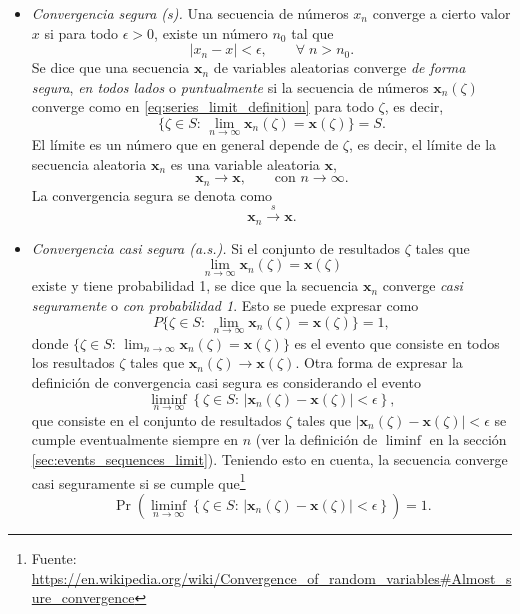\documentclass[a4paper]{report}
\newcommand{\x}{\mathbf{x}}
\begin{document}
\begin{itemize}
 \item \emph{Convergencia segura (s).} Una secuencia de números \(x_n\) converge a cierto valor \(x\) si para todo \(\epsilon>0\), existe un número \(n_0\) tal que
 \begin{equation}\label{eq:series_limit_definition}
    |x_n-x|<\epsilon,\qquad\forall\;n>n_0.
 \end{equation}
 Se dice que una secuencia \(\x_n\) de variables aleatorias converge \emph{de forma segura}, \emph{en todos lados} o \emph{puntualmente} si la secuencia de números \(\x_n(\zeta)\) converge como en \ref{eq:series_limit_definition} para todo \(\zeta\), es decir,
 \[
  \{\zeta\in S:\,\lim_{n\to\infty}\x_n(\zeta)=\x(\zeta)\}=S.
 \]
 El límite es un número que en general depende de \(\zeta\), es decir, el límite de la secuencia aleatoria \(\x_n\) es una variable aleatoria \(\x\),
 \[
  \x_n\to\x,\qquad \textrm{con }n\to\infty.
 \]
 La convergencia segura se denota como
 \[
  \x_n\overset{s}{\longrightarrow}\x.
 \]  
 \item \emph{Convergencia casi segura (a.s.).} Si el conjunto de resultados \(\zeta\) tales que
 \[
  \lim_{n\to\infty} \x_n(\zeta)=\x(\zeta)
 \]
 existe y tiene probabilidad 1, se dice que la secuencia \(\x_n\) converge \emph{casi seguramente} o \emph{con probabilidad 1}. Esto se puede expresar como
 \[
  P\{\zeta\in S:\,\lim_{n\to\infty}\x_n(\zeta)=\x(\zeta)\}=1,
 \]
 donde \(\{\zeta\in S:\,\lim_{n\to\infty}\x_n(\zeta)=\x(\zeta)\}\) es el evento que consiste en todos los resultados \(\zeta\) tales que \(\x_n(\zeta)\to\x(\zeta)\). Otra forma de expresar la definición de convergencia casi segura es considerando el evento
 \[
 \liminf_{n\to\infty}\left\{\zeta\in S:\,|\x_n(\zeta)-\x(\zeta)|<\epsilon \right\},
 \]
 que consiste en el conjunto de resultados \(\zeta\) tales que \(|\x_n(\zeta)-\x(\zeta)|<\epsilon\) se cumple eventualmente siempre en \(n\) (ver la definición de \(\liminf\) en la sección \ref{sec:events_sequences_limit}). Teniendo esto en cuenta, la secuencia converge casi seguramente si se cumple que\footnote{Fuente: \url{https://en.wikipedia.org/wiki/Convergence_of_random_variables\#Almost_sure_convergence}}
 \[
  \Pr\left(\liminf_{n\to\infty}\left\{\zeta\in S:\,|\x_n(\zeta)-\x(\zeta)|<\epsilon \right\}\right)=1.
 \]
 

\end{itemize}
\end{document}
